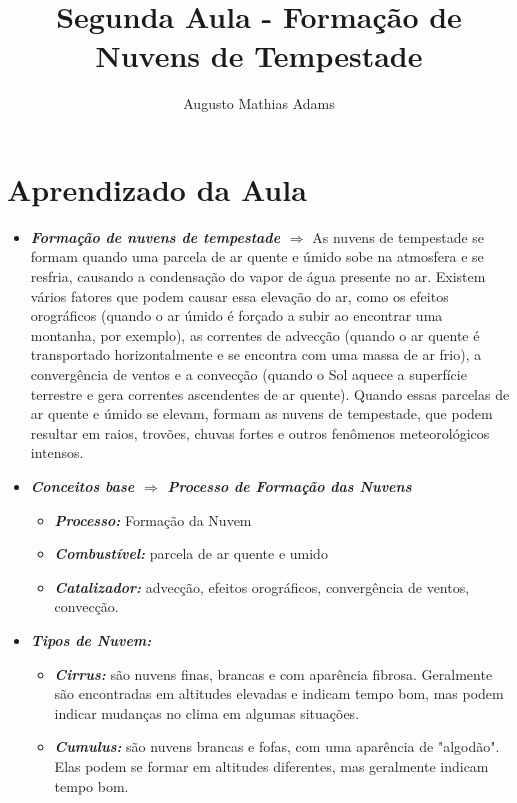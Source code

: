 \documentclass[a4paper, 12pt, onecolumn,singlespacing]{article}
\title{Segunda Aula - Formação de Nuvens de Tempestade}
\author[1]{Augusto Mathias Adams}
\affil[1]{augusto.adams@ufpr.br}
\begin{document}
	
	\maketitle
	
	\section{Aprendizado da Aula}
	
	\begin{itemize}
		\item \textbf{\textit{Formação de nuvens de tempestade $\Rightarrow$ }} As nuvens de tempestade se formam quando uma parcela de ar quente e úmido sobe na atmosfera e se resfria, causando a condensação do vapor de água presente no ar. Existem vários fatores que podem causar essa elevação do ar, como os efeitos orográficos (quando o ar úmido é forçado a subir ao encontrar uma montanha, por exemplo), as correntes de advecção (quando o ar quente é transportado horizontalmente e se encontra com uma massa de ar frio), a convergência de ventos e a convecção (quando o Sol aquece a superfície terrestre e gera correntes ascendentes de ar quente). Quando essas parcelas de ar quente e úmido se elevam, formam as nuvens de tempestade, que podem resultar em raios, trovões, chuvas fortes e outros fenômenos meteorológicos intensos.
		\item \textbf{\textit{Conceitos base $\Rightarrow$ Processo de Formação das Nuvens}}
		\begin{itemize}
			\item \textbf{\textit{Processo: }}Formação da Nuvem
			\item \textbf{\textit{Combustível: }}parcela de ar quente e umido
			\item \textbf{\textit{Catalizador: }}advecção, efeitos orográficos, convergência de ventos, convecção.
		\end{itemize}
		\item \textbf{\textit{Tipos de Nuvem:}}
		\begin{itemize}
			\item  \textbf{\textit{Cirrus:}} são nuvens finas, brancas e com aparência fibrosa. Geralmente são encontradas em altitudes elevadas e indicam tempo bom, mas podem indicar mudanças no clima em algumas situações.
			
			\item \textbf{\textit{Cumulus:}} são nuvens brancas e fofas, com uma aparência de "algodão". Elas podem se formar em altitudes diferentes, mas geralmente indicam tempo bom.
			

\end{itemize}
\end{itemize}
\end{document}
